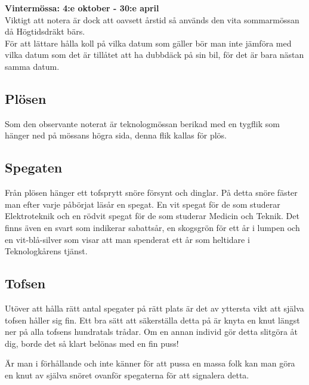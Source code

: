 \textbf{Vintermössa: 4:e oktober - 30:e april}
\\


Viktigt att notera är dock att oavsett årstid så används den vita sommarmössan då Högtidsdräkt bärs.
\\


För att lättare hålla koll på vilka datum som gäller bör man inte jämföra med vilka datum som det är tillåtet att ha dubbdäck på sin bil, för det är bara nästan samma datum.


\newpage
\enlargethispage*{1cm}

\subsection*{Plösen}
Som den observante noterat är teknologmössan berikad med en tygflik som hänger ned på mössans högra sida, denna flik kallas för plös. 
\\

\subsection*{Spegaten}
Från plösen hänger ett tofsprytt snöre försynt och dinglar. På detta snöre fäster man efter varje påbörjat läsår en spegat. En vit spegat för de som studerar Elektroteknik och en rödvit spegat för de som studerar Medicin och Teknik.
Det finns även en svart som indikerar sabattsår, en skogsgrön för ett år i lumpen och en vit-blå-silver som visar att man spenderat ett år som heltidare i Teknologkårens tjänst.
\\


\subsection*{Tofsen}
Utöver att hålla rätt antal spegater på rätt plats är det av yttersta vikt att själva tofsen håller sig fin. Ett bra sätt att säkerställa detta på är knyta en knut längst ner på alla tofsens hundratals trådar. Om en annan individ gör detta slitgöra åt dig, borde det så klart belönas med en fin puss!


Är man i förhållande och inte känner för att pussa en massa folk kan man göra en knut av själva snöret ovanför spegaterna för att signalera detta.
\\


\newpage

